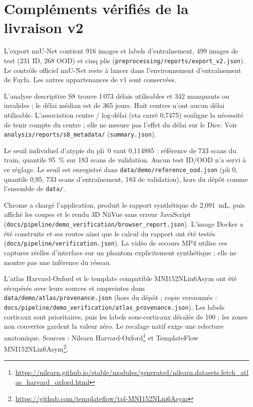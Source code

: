 \section{Compléments vérifiés de la livraison v2}
\label{sec:yosra-livraison}

L'export nnU-Net contient 916 images et labels d'entraînement, 499 images de test (231 ID, 268 OOD) et cinq plis (\nolinkurl{preprocessing/reports/export_v2.json}).
Le contrôle officiel nnU-Net reste à lancer dans l'environnement d'entraînement de Fayfa.
Les autres appartenances de v1 sont conservées.

L'analyse descriptive S8 trouve 1\,073 délais utilisables et 342 manquants ou invalides ; le délai médian est de 365 jours.
Huit centres n'ont aucun délai utilisable.
L'association centre / log-délai (eta carré 0,7475) souligne la nécessité de tenir compte du centre ; elle ne mesure pas l'effet du délai sur le Dice.
Voir \nolinkurl{analysis/reports/s8_metadata/} (\nolinkurl{summary.json}).

Le seuil individuel d'atypie du pli~0 vaut 0,114885 : référence de 733 scans du train, quantile 95~\% sur 183 scans de validation.
Aucun test ID/OOD n'a servi à ce réglage.
Le seuil est enregistré dans \texttt{data/demo/reference\_ood.json} (pli 0, quantile 0,95,
733 scans d'entraînement, 183 de validation), hors du dépôt comme l'ensemble de \texttt{data/}.

Chrome a chargé l'application, produit le rapport synthétique de 2,091~mL, puis affiché les coupes et le rendu 3D NiiVue sans erreur JavaScript (\nolinkurl{docs/pipeline/demo_verification/browser_report.json}).
L'image Docker a été construite et ses routes ainsi que le calcul du rapport ont été testés (\nolinkurl{docs/pipeline/verification.json}).
La vidéo de secours MP4 utilise ces captures réelles d'interface sur un phantom explicitement synthétique ; elle ne montre pas une inférence du réseau.

L'atlas Harvard-Oxford et le template compatible MNI152NLin6Asym ont été récupérés avec leurs sources et empreintes dans \nolinkurl{data/demo/atlas/provenance.json} (hors du dépôt ; copie versionnée : \nolinkurl{docs/pipeline/demo_verification/atlas_provenance.json}).
Les labels corticaux sont prioritaires, puis les labels sous-corticaux décalés de 100 ; les zones non couvertes gardent la valeur zéro.
Le recalage natif exige une relecture anatomique.
Sources : Nilearn Harvard-Oxford\footnote{\url{https://nilearn.github.io/stable/modules/generated/nilearn.datasets.fetch_atlas_harvard_oxford.html}} et TemplateFlow MNI152NLin6Asym\footnote{\url{https://github.com/templateflow/tpl-MNI152NLin6Asym}}.

